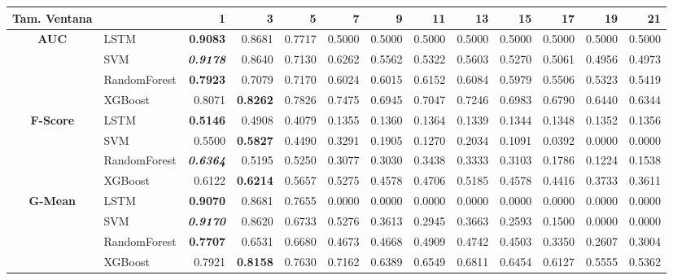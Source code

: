 \begin{table}[H]
\centering
\begin{adjustbox}{max width=14cm}
	\begin{tabular}{|c|l|r|r|r|r|r|r|r|r|r|r|r|}
		\hline
		\textbf{Tam. Ventana} &         &      1  &      3  &      5  &      7  &      9  &      11 &      13 &      15 &      17 &      19 &      21 \\
		\hline
		\textbf{AUC} &  LSTM & \textbf{  0.9083 } &  0.8681 &  0.7717 &  0.5000 &  0.5000 &  0.5000 &  0.5000 &  0.5000 &  0.5000 &  0.5000 &  0.5000 \\
		&  SVM & \textit{ \textbf{  0.9178 } } &  0.8640 &  0.7130 &  0.6262 &  0.5562 &  0.5322 &  0.5603 &  0.5270 &  0.5061 &  0.4956 &  0.4973 \\
		&  RandomForest & \textbf{  0.7923 } &  0.7079 &  0.7170 &  0.6024 &  0.6015 &  0.6152 &  0.6084 &  0.5979 &  0.5506 &  0.5323 &  0.5419 \\
		&  XGBoost &  0.8071 & \textbf{  0.8262 } &  0.7826 &  0.7475 &  0.6945 &  0.7047 &  0.7246 &  0.6983 &  0.6790 &  0.6440 &  0.6344 \\
		\hline
		\textbf{F-Score} &  LSTM & \textbf{  0.5146 } &  0.4908 &  0.4079 &  0.1355 &  0.1360 &  0.1364 &  0.1339 &  0.1344 &  0.1348 &  0.1352 &  0.1356 \\
		&  SVM &  0.5500 & \textbf{  0.5827 } &  0.4490 &  0.3291 &  0.1905 &  0.1270 &  0.2034 &  0.1091 &  0.0392 &  0.0000 &  0.0000 \\
		&  RandomForest & \textit{ \textbf{  0.6364 } } &  0.5195 &  0.5250 &  0.3077 &  0.3030 &  0.3438 &  0.3333 &  0.3103 &  0.1786 &  0.1224 &  0.1538 \\
		&  XGBoost &  0.6122 & \textbf{  0.6214 } &  0.5657 &  0.5275 &  0.4578 &  0.4706 &  0.5185 &  0.4578 &  0.4416 &  0.3733 &  0.3611 \\
		\hline
		\textbf{G-Mean} &  LSTM & \textbf{  0.9070 } &  0.8681 &  0.7655 &  0.0000 &  0.0000 &  0.0000 &  0.0000 &  0.0000 &  0.0000 &  0.0000 &  0.0000 \\
		&  SVM & \textit{ \textbf{  0.9170 } } &  0.8620 &  0.6733 &  0.5276 &  0.3613 &  0.2945 &  0.3663 &  0.2593 &  0.1500 &  0.0000 &  0.0000 \\
		&  RandomForest & \textbf{  0.7707 } &  0.6531 &  0.6680 &  0.4673 &  0.4668 &  0.4909 &  0.4742 &  0.4503 &  0.3350 &  0.2607 &  0.3004 \\
		&  XGBoost &  0.7921 & \textbf{  0.8158 } &  0.7630 &  0.7162 &  0.6389 &  0.6549 &  0.6811 &  0.6454 &  0.6127 &  0.5555 &  0.5362 \\

\end{tabular}
\end{adjustbox}
\end{table}
